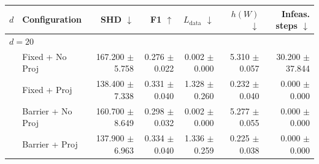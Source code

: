 \begin{tabular}{llrrrrr}
\toprule
$d$ & Configuration & SHD $\downarrow$ & F1 $\uparrow$ & $L_{\text{data}}$ $\downarrow$ & $h(W)$ $\downarrow$ & Infeas. steps $\downarrow$ \\
\midrule
\multicolumn{7}{l}{$d = 20$} \\
  & Fixed + No Proj & 167.200 $\pm$ 5.758 & 0.276 $\pm$ 0.022 & 0.002 $\pm$ 0.000 & 5.310 $\pm$ 0.057 & 30.200 $\pm$ 37.844 \\
  & Fixed + Proj & 138.400 $\pm$ 7.338 & 0.331 $\pm$ 0.040 & 1.328 $\pm$ 0.260 & 0.232 $\pm$ 0.040 & 0.000 $\pm$ 0.000 \\
  & Barrier + No Proj & 160.700 $\pm$ 8.649 & 0.298 $\pm$ 0.032 & 0.002 $\pm$ 0.000 & 5.277 $\pm$ 0.055 & 0.000 $\pm$ 0.000 \\
  & Barrier + Proj & 137.900 $\pm$ 6.963 & 0.334 $\pm$ 0.040 & 1.336 $\pm$ 0.259 & 0.225 $\pm$ 0.038 & 0.000 $\pm$ 0.000 \\
\bottomrule
\end{tabular}